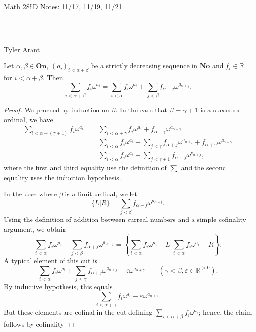 
\begin{center} \begin{Large} Math 285D Notes: 11/17, 11/19, 11/21 \end{Large}\\
\text{} \\
\begin{large} Tyler Arant  \end{large}
\end{center}

\begin{lemma}[Associativity] \label{6.7} Let $\alpha, \beta \in \textbf{On}$, $(a_i)_{i<\alpha+\beta}$ be a strictly decreasing sequence in $\textbf{No}$ and $f_i\in \mathds{R}$ for $i<\alpha+\beta$.  Then,
$$\sum_{i<\alpha+\beta} f_i\omega^{a_i}=\sum_{i<\alpha} f_i\omega^{a_i} + \sum_{j<\beta}f_{\alpha+j}\omega^{a_{\alpha+j}}.$$
\end{lemma}

\begin{proof} We proceed by induction on $\beta$.  In the case that $\beta=\gamma+1$ is a successor ordinal, we have
\begin{align*} \sum_{i<\alpha+(\gamma+1)} f_i\omega^{a_i}&= \sum_{i<\alpha+\gamma} f_i\omega^{a_i} + f_{\alpha+\gamma}\omega^{a_{\alpha+\gamma}} \\
		&= \sum_{i<\alpha} f_i\omega^{a_i}+ \sum_{j<\gamma} f_{\alpha+j} \omega^{a_{\alpha+j}}+ f_{\alpha+\gamma}\omega^{a_{\alpha+\gamma}}\\
		& = \sum_{i<\alpha} f_i\omega^{a_i} + \sum_{j<\gamma+1}f_{\alpha+j}\omega^{a_{\alpha+j}}, \end{align*}
where the first and third equality use the definition of $\sum$ and the second equality uses the induction hypothesis.  

In the case where $\beta$ is a limit ordinal, we let 
$$\{L | R\} = \sum_{j<\beta}f_{\alpha+j}\omega^{a_{\alpha+j}}.$$
Using the definition of addition between surreal numbers and a simple cofinality argument, we obtain
$$\sum_{i<\alpha}f_i\omega^{a_i} + \sum_{j<\beta}f_{\alpha+j}\omega^{a_{\alpha+j}} = \left \{\sum_{i<\alpha}f_i\omega^{a_i} + L \biggl | \sum_{i<\alpha}f_i\omega^{a_i} + R \right \}.$$
A typical element of this cut is 
$$\sum_{i<\alpha}f_i\omega^{a_i} + \sum_{j\leq \gamma} f_{\alpha+j}\omega^{a_{\alpha+j}}-\varepsilon \omega^{a_{\alpha+\gamma}}  \qquad (\gamma<\beta, \varepsilon \in \mathds{R}^{>0}).$$
By inductive hypothesis, this equals
$$\sum_{i<\alpha+\gamma}f_i \omega^{a_i}- \varepsilon \omega^{a_{\alpha+\gamma}}.$$
But these elements are cofinal in the cut defining $\sum_{i<\alpha+\beta} f_i\omega^{a_i}$; hence, the claim follows by cofinality. 
\end{proof}

